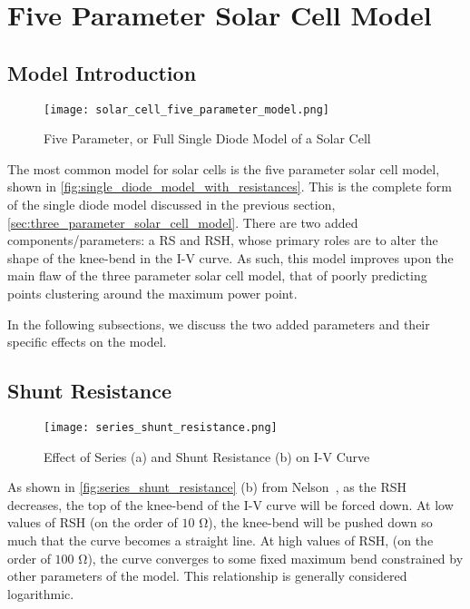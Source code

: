 \section{Five Parameter Solar Cell Model}\label{sec:five_parameter_solar_cell_model}

\subsection{Model Introduction}\label{subsec:five_param_model_introduction}

\begin{figure}[h]
    \texttt{[image: solar\_cell\_five\_parameter\_model.png]}
    \caption{Five Parameter, or Full Single Diode Model of a Solar Cell}
    \label{fig:single_diode_model_with_resistances}
\end{figure}

The most common model for solar cells is the five parameter solar cell model,
shown in \autoref{fig:single_diode_model_with_resistances}. This is the complete
form of the single diode model discussed in the previous section,
\autoref{sec:three_parameter_solar_cell_model}. There are two added
components/parameters: a \acf{RS} and \acf{RSH}, whose primary roles are to
alter the shape of the knee-bend in the I-V curve. As such, this model improves
upon the main flaw of the three parameter solar cell model, that of poorly
predicting points clustering around the maximum power point.

In the following subsections, we discuss the two added parameters and their
specific effects on the model.


\subsection{Shunt Resistance}\label{subsec:five_param_shunt_resistance}

\begin{figure}[h]
    \texttt{[image: series\_shunt\_resistance.png]}
    \caption{Effect of Series (a) and Shunt Resistance (b) on \ac{I-V} Curve}
    \label{fig:series_shunt_resistance}
\end{figure}

As shown in \autoref{fig:series_shunt_resistance} (b) from Nelson~\cite{nelson},
as the \acf{RSH} decreases, the top of the knee-bend of the \acf{I-V} curve will
be forced down. At low values of \ac{RSH} (on the order of $10$ $\si{\ohm}$),
the knee-bend will be pushed down so much that the curve becomes a straight
line. At high values of \ac{RSH}, (on the order of $100$ $\si{\ohm}$), the curve
converges to some fixed maximum bend constrained by other parameters of the
model. This relationship is generally considered logarithmic.

